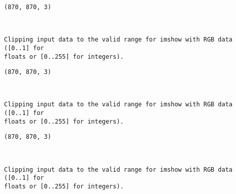 \documentclass[11pt]{article}
\begin{document}
    \begin{Verbatim}[commandchars=\\\{\}]
(870, 870, 3)
    \end{Verbatim}

    \begin{center}
    \end{center}
    { \hspace*{\fill} \\}
    
    \begin{Verbatim}[commandchars=\\\{\}]
Clipping input data to the valid range for imshow with RGB data ([0..1] for
floats or [0..255] for integers).
    \end{Verbatim}

    \begin{Verbatim}[commandchars=\\\{\}]
(870, 870, 3)
    \end{Verbatim}

    \begin{center}
    \end{center}
    { \hspace*{\fill} \\}
    
    \begin{Verbatim}[commandchars=\\\{\}]
Clipping input data to the valid range for imshow with RGB data ([0..1] for
floats or [0..255] for integers).
    \end{Verbatim}

    \begin{Verbatim}[commandchars=\\\{\}]
(870, 870, 3)
    \end{Verbatim}

    \begin{center}
    \end{center}
    { \hspace*{\fill} \\}
    
    \begin{Verbatim}[commandchars=\\\{\}]
Clipping input data to the valid range for imshow with RGB data ([0..1] for
floats or [0..255] for integers).
    \end{Verbatim}
\end{document}
